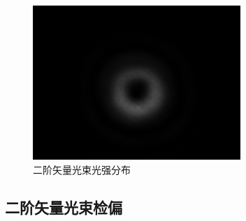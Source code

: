 \documentclass[a4paper,UTF8]{ctexart}
\begin{document}
\begin{figure}[H]
    \centering
    \begin{minipage}[b]{0.9\textwidth}
        \centering
        \includegraphics[width=0.7\textwidth]{./fig/2.png}
        \caption{二阶矢量光束光强分布}
    \end{minipage}
\end{figure}

\subsection{二阶矢量光束检偏}
\end{document}
